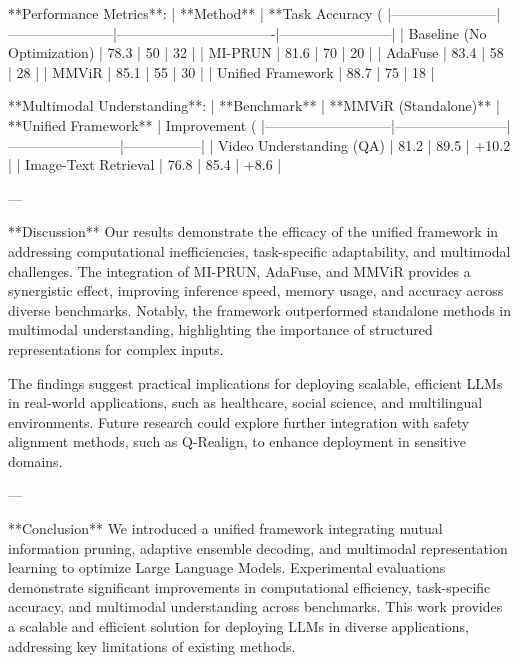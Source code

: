 **Performance Metrics**:  
| **Method**           | **Task Accuracy (%
|-----------------------|-----------------------|----------------------------------|------------------------|  
| Baseline (No Optimization) | 78.3                 | 50                               | 32                     |  
| MI-PRUN               | 81.6                 | 70                               | 20                     |  
| AdaFuse               | 83.4                 | 58                               | 28                     |  
| MMViR                 | 85.1                 | 55                               | 30                     |  
| Unified Framework     | 88.7                 | 75                               | 18                     |  

**Multimodal Understanding**:  
| **Benchmark**             | **MMViR (Standalone)** | **Unified Framework** | Improvement (%
|---------------------------|------------------------|------------------------|-----------------|  
| Video Understanding (QA)  | 81.2                  | 89.5                  | +10.2           |  
| Image-Text Retrieval       | 76.8                  | 85.4                  | +8.6            |  

---

**Discussion**  
Our results demonstrate the efficacy of the unified framework in addressing computational inefficiencies, task-specific adaptability, and multimodal challenges. The integration of MI-PRUN, AdaFuse, and MMViR provides a synergistic effect, improving inference speed, memory usage, and accuracy across diverse benchmarks. Notably, the framework outperformed standalone methods in multimodal understanding, highlighting the importance of structured representations for complex inputs.  

The findings suggest practical implications for deploying scalable, efficient LLMs in real-world applications, such as healthcare, social science, and multilingual environments. Future research could explore further integration with safety alignment methods, such as Q-Realign, to enhance deployment in sensitive domains.  

---

**Conclusion**  
We introduced a unified framework integrating mutual information pruning, adaptive ensemble decoding, and multimodal representation learning to optimize Large Language Models. Experimental evaluations demonstrate significant improvements in computational efficiency, task-specific accuracy, and multimodal understanding across benchmarks. This work provides a scalable and efficient solution for deploying LLMs in diverse applications, addressing key limitations of existing methods.  

